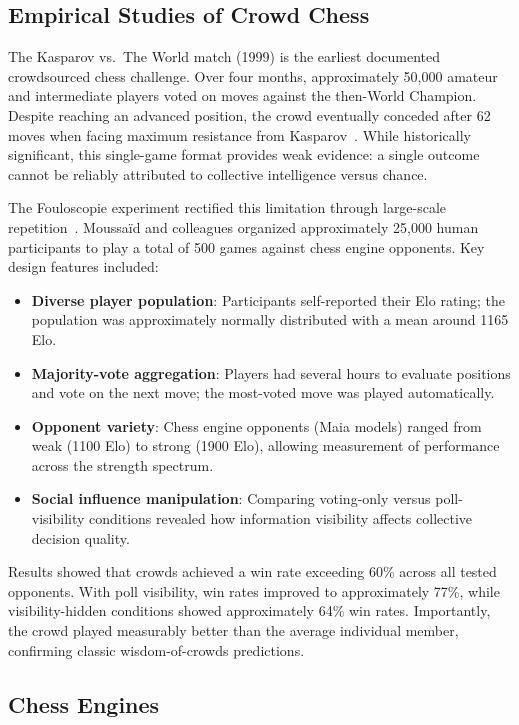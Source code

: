\documentclass[sigconf]{aamas}
\begin{document}
\subsection{Empirical Studies of Crowd Chess}

The Kasparov vs.\ The World match (1999) is the earliest documented crowdsourced chess challenge.
Over four months, approximately 50,000 amateur and intermediate players voted on moves against the then-World Champion.
Despite reaching an advanced position, the crowd eventually conceded after 62 moves when facing maximum resistance from Kasparov~\cite{kasparov1999}.
While historically significant, this single-game format provides weak evidence: a single outcome cannot be reliably attributed to collective intelligence versus chance.

The Fouloscopie experiment rectified this limitation through large-scale repetition~\cite{moussaid2025}.
Moussaïd and colleagues organized approximately 25,000 human participants to play a total of 500 games against chess engine opponents.
Key design features included:
\begin{itemize}
  \item \textbf{Diverse player population}: Participants self-reported their Elo rating; the population was approximately normally distributed with a mean around 1165 Elo.
  \item \textbf{Majority-vote aggregation}: Players had several hours to evaluate positions and vote on the next move; the most-voted move was played automatically.
  \item \textbf{Opponent variety}: Chess engine opponents (Maia models) ranged from weak (1100 Elo) to strong (1900 Elo), allowing measurement of performance across the strength spectrum.
  \item \textbf{Social influence manipulation}: Comparing voting-only versus poll-visibility conditions revealed how information visibility affects collective decision quality.
\end{itemize}
Results showed that crowds achieved a win rate exceeding 60\% across all tested opponents.
With poll visibility, win rates improved to approximately 77\%, while visibility-hidden conditions showed approximately 64\% win rates.
Importantly, the crowd played measurably better than the average individual member, confirming classic wisdom-of-crowds predictions.

\subsection{Chess Engines}
\end{document}
